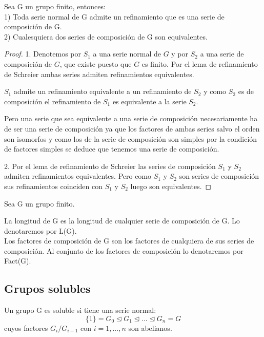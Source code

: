 \begin{theorem}
Sea G un grupo finito, entonces:\\
1) Toda serie normal de G admite un refinamiento que es una serie de composición de G.\\
2) Cualesquiera dos series de composición de G son equivalentes.
\end{theorem}
\begin{proof}
1. Denotemos por $S_1$ a una serie normal de $G$ y por $S_2$ a una serie de composición de $G$, que existe puesto que $G$ es finito. Por el lema de refinamiento de Schreier ambas series admiten refinamientos equivalentes. 

$S_1$ admite un refinamiento equivalente a un refinamiento de $S_2$ y como $S_2$ es de composición el refinamiento de $S_1$ es equivalente a la serie $S_2$.

Pero una serie que sea equivalente a una serie de composición necesariamente ha de ser una serie de composición ya que los factores de ambas series salvo el orden son isomorfos y como los de la serie de composición son simples por la condición de factores simples se deduce que tenemos una serie de composición.

2. Por el lema de refinamiento de Schreier las series de composición $S_1$ y $S_2$ admiten refinamientos equivalentes. Pero como $S_1$ y $S_2$ son series de composición sus refinamientos coinciden con $S_1$ y $S_2$ luego son equivalentes.
\end{proof}

\begin{definition}
Sea G un grupo finito.

La longitud de G es la longitud de cualquier serie de composición de G. Lo denotaremos por L(G).\\
Los factores de composición de G son los factores de cualquiera de sus series de composición. Al conjunto de los factores de composición lo denotaremos por Fact(G).
\end{definition}

\subsection{Grupos solubles}

\begin{definition}
Un grupo G es soluble si tiene una serie normal: $$\{1\} = G_0 \trianglelefteq G_1 \trianglelefteq ... \trianglelefteq G_n = G$$ cuyos factores $G_i/G_{i-1}$ con $i=1,...,n$ son abelianos.
\end{definition}

